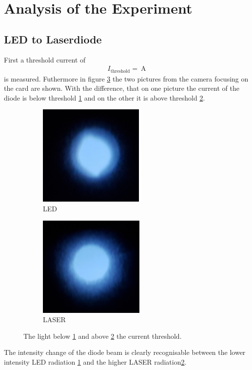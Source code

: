 \section{Analysis of the Experiment}
\label{sec:Auswertung}



\subsection{LED to Laserdiode}
\label{sec:LED_Laser}
First a threshold current of
\begin{align}
I_{\mathrm{threshold}} = \SI{}{\ampere}
\end{align}
is measured.
Futhermore in figure \ref{fig:threshold} the two
pictures from the camera focusing on the card are shown.
With the difference, that on one picture the current of the diode is below threshold \ref{fig:LED} and
on the other it is above threshold \ref{fig:LASER}.
\begin{figure}
  \centering
  \begin{subfigure}{0.45\textwidth}
    \centering
    \includegraphics[height = 5cm]{figures/bevore_threshole.jpg}
    \caption{LED}
    \label{fig:LED}
  \end{subfigure}
  \begin{subfigure}{0.45\textwidth}
    \centering
    \includegraphics[height = 5cm]{figures/after_threshole.jpg}
    \caption{LASER}
    \label{fig:LASER}
  \end{subfigure}
\caption{The light below \ref{fig:LED} and above \ref{fig:LASER} the current threshold.}
\label{fig:threshold}
\end{figure}
The intensity change of the diode beam is clearly recognisable
between the lower intensity LED radiation \ref{fig:LED}
and the higher LASER radiation\ref{fig:LASER}.


